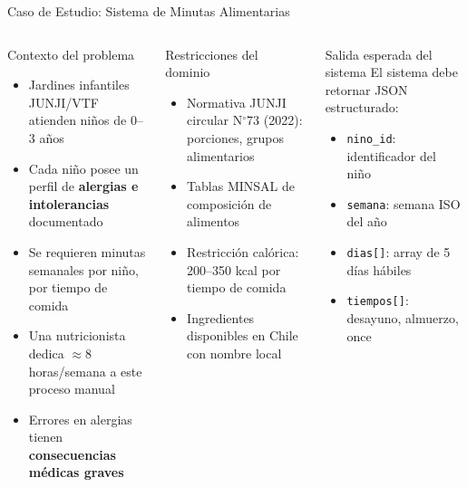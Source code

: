 \documentclass[aspectratio=169]{beamer}
\begin{document}
\begin{frame}{Caso de Estudio: Sistema de Minutas Alimentarias}
  \begin{columns}
    \begin{block}{Contexto del problema}
      \begin{itemize}
        \item Jardines infantiles JUNJI/VTF atienden niños de 0--3 años
        \item Cada niño posee un perfil de \textbf{alergias e intolerancias} documentado
        \item Se requieren minutas semanales por niño, por tiempo de comida
        \item Una nutricionista dedica $\approx$8 horas/semana a este proceso manual
        \item Errores en alergias tienen \textbf{consecuencias médicas graves}
      \end{itemize}
    \end{block}
    \vspace{0.3em}
    \begin{alertblock}{Restricciones del dominio}
      \begin{itemize}
        \item Normativa JUNJI circular N$^{\circ}$73 (2022): porciones, grupos alimentarios
        \item Tablas MINSAL de composición de alimentos
        \item Restricción calórica: 200--350 kcal por tiempo de comida
        \item Ingredientes disponibles en Chile con nombre local
      \end{itemize}
    \end{alertblock}
    \begin{exampleblock}{Salida esperada del sistema}
      \scriptsize
      El sistema debe retornar JSON estructurado:
      \vspace{0.4em}
      \begin{itemize}
        \item \texttt{nino\_id}: identificador del niño
        \item \texttt{semana}: semana ISO del año
        \item \texttt{dias[]}: array de 5 días hábiles
        \item \texttt{tiempos[]}: desayuno, almuerzo, once

\end{itemize}
\end{exampleblock}
\end{columns}
\end{frame}
\end{document}
